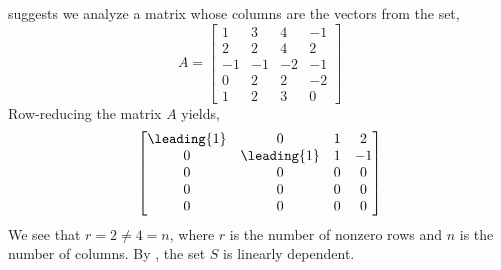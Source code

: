  suggests we analyze a matrix whose columns are the vectors from the set,
%
\begin{equation*}
A=\begin{bmatrix}
1 & 3 & 4 & -1\\
2 & 2 & 4 & 2\\
-1 & -1 & -2 & -1\\
0 & 2 & 2 & -2\\
1 & 2 & 3 & 0
\end{bmatrix}
\end{equation*}
%
Row-reducing the matrix $A$ yields,
%
\begin{equation*}
\begin{bmatrix}
\leading{1} & 0 & 1 & 2\\
0 & \leading{1} & 1 & -1\\
0 & 0 & 0 & 0\\
0 & 0 & 0 & 0\\
0 & 0 & 0 & 0
\end{bmatrix}
\end{equation*}
%
We see that $r=2\neq 4=n$, where $r$ is the number of nonzero rows and $n$ is the number of columns.  By , the set $S$ is  linearly dependent.